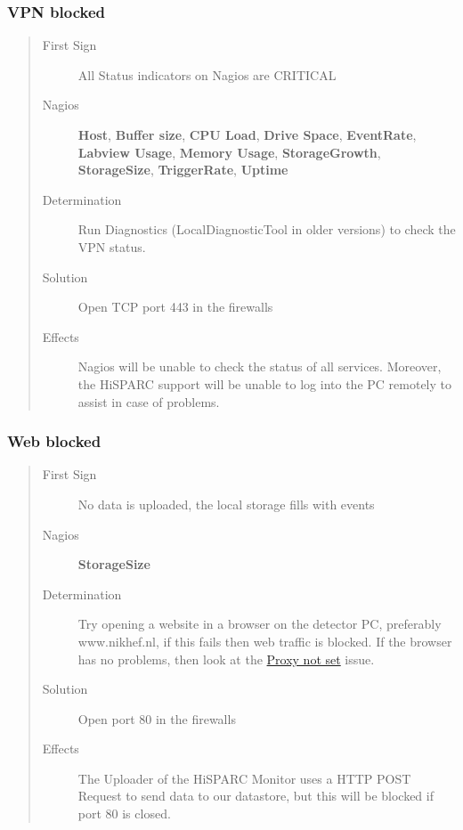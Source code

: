 \documentclass[a4paper,11pt,english]{sphinxmanual}
\begin{document}
\subsubsection{VPN blocked}
\label{known-issues:vpn-blocked}\begin{quote}\begin{description}
\item[{First Sign}] \leavevmode
All Status indicators on Nagios are CRITICAL

\item[{Nagios}] \leavevmode
\textbf{Host}, \textbf{Buffer size}, \textbf{CPU Load}, \textbf{Drive Space}, \textbf{EventRate}, \textbf{Labview Usage}, \textbf{Memory Usage}, \textbf{StorageGrowth}, \textbf{StorageSize}, \textbf{TriggerRate}, \textbf{Uptime}

\item[{Determination}] \leavevmode
Run Diagnostics (LocalDiagnosticTool in older versions) to check the VPN status.

\item[{Solution}] \leavevmode
Open TCP port 443 in the firewalls

\item[{Effects}] \leavevmode
Nagios will be unable to check the status of all services. Moreover, the HiSPARC support will be unable to log into the PC remotely to assist in case of problems.

\end{description}\end{quote}


\subsubsection{Web blocked}
\label{known-issues:web-blocked}\begin{quote}\begin{description}
\item[{First Sign}] \leavevmode
No data is uploaded, the local storage fills with events

\item[{Nagios}] \leavevmode
\textbf{StorageSize}

\item[{Determination}] \leavevmode
Try opening a website in a browser on the detector PC, preferably www.nikhef.nl, if this fails then web traffic is blocked. If the browser has no problems, then look at the {\hyperref[known-issues:proxy-not-set]{Proxy not set}} issue.

\item[{Solution}] \leavevmode
Open port 80 in the firewalls

\item[{Effects}] \leavevmode
The Uploader of the HiSPARC Monitor uses a HTTP POST Request to send data to our datastore, but this will be blocked if port 80 is closed.

\end{description}\end{quote}
\end{document}
